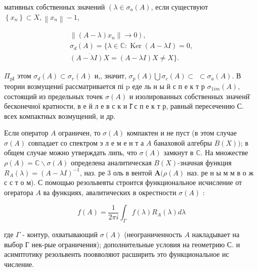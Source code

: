 \documentclass[10pt]{article}
\begin{document}
мативных собственных значений $\left(\lambda \in \sigma_{a}(A)\right.$, если существуют $\left\{x_{n}\right\} \subset X,\left\|x_{n}\right\|-1$,



\[

\begin{gathered}

\left.\left\|(A-\lambda) x_{n}\right\| \rightarrow 0\right), \\

\sigma_{d}(A)=\{\lambda \in \mathbb{C}: \operatorname{Ker}(A-\lambda I)=0, \\

\overline{(A-\lambda I) X}=(A-\lambda I) X \neq X\} .

\end{gathered}

\]



$\Pi_{\mathrm{pI}}$ этом $\sigma_{d}(A) \subset \sigma_{r}(A)$ и,, значит, $\sigma_{p}(A) \bigcup \sigma_{c}(A) \subset$ $\subset \sigma_{a}(A)$. В теории возмущениї рассматривается пі $\mathrm{p}$ еде ль н ы й с п е к т р $\sigma_{1 i m}(A)$, состоящий из предельных точек $\sigma(A)$ и изолированных собственных значенй̈ бесконечної кратности, в е й л е в с к и І̆ с п е к т р, равный пересечению С. всех компактных возмущений, и др.



Если оператор $A$ ограничен, то $\sigma(A)$ компактен и не пуст (в этом случае $\sigma(A)$ совпадает со спектром э л е м е н т а $A$ банаховой алгебры $B(X))$; в общем случае можно утверждать липь, что $\sigma(A)$ замкнут в $\mathbb{C}$. На множестве $\rho(A)=\mathbb{C} \backslash \sigma(A)$ определена аналитическая $B(X)$-значная функция $R_{A}(\lambda)=(A-\lambda I)^{-1}$, наз. ре 3 оль в вентой $\boldsymbol{A}(\rho(A)$ наз. ре н ы м м в о ж с с т о м). С помощью резольвевты строится функциональное исчисление от огератора $A$ ва функциях, авалитических в окрестности $\sigma(A)$ :



\[

f(A)=\frac{1}{2 \pi i} \int_{\Gamma} f(\lambda) R_{A}(\lambda) d \lambda

\]



где $\Gamma$ - контур, охватывающий $\sigma(A)$ (неограниченность $A$ накладывает на выбор Г нек-рые ограничения); дополнительные условия на геометрию С. и асимптотику резольвенть поовволяют расширить это функциональное ис числение.
\end{document}
